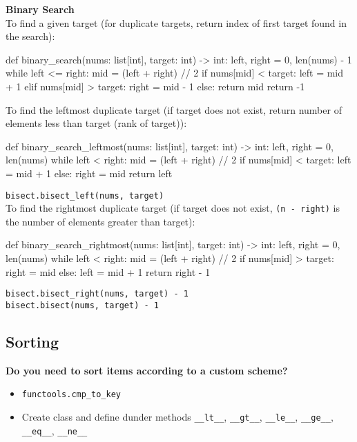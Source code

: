 \documentclass[12pt]{article}
\begin{document}
\begin{adjustwidth}{2em}{0pt}
\textbf{Binary Search}\medskip \\
To find a given target (for duplicate targets, return index of first target found in the search):
\begin{python}
def binary_search(nums: list[int], target: int) -> int:
    left, right = 0, len(nums) - 1
    while left <= right:
        mid = (left + right) // 2
        if nums[mid] < target:
            left = mid + 1
        elif nums[mid] > target:
            right = mid - 1
        else:
            return mid
    return -1
\end{python}
\bigskip

To find the leftmost duplicate target (if target does not exist, return number of elements less than target (rank of target)):
\begin{python}
def binary_search_leftmost(nums: list[int], target: int) -> int:
    left, right = 0, len(nums)
    while left < right:
        mid = (left + right) // 2
        if nums[mid] < target:
            left = mid + 1
        else:
            right = mid
    return left
\end{python}
\texttt{bisect.bisect\_left(nums, target)} \\

To find the rightmost duplicate target (if target does not exist, \texttt{(n - right)} is the number of elements greater than target):
\begin{python}
def binary_search_rightmost(nums: list[int], target: int) -> int:
    left, right = 0, len(nums)
    while left < right:
        mid = (left + right) // 2
        if nums[mid] > target:
            right = mid
        else:
            left = mid + 1
    return right - 1
\end{python}
\texttt{bisect.bisect\_right(nums, target) - 1} \\
\texttt{bisect.bisect(nums, target) - 1}
\end{adjustwidth}

\subsection*{Sorting}

\begin{adjustwidth}{2em}{0pt}
\textbf{Do you need to sort items according to a custom scheme?}
\begin{itemize}
  \item \texttt{functools.cmp\_to\_key} 
  \item Create class and define dunder methods \texttt{\_\_lt\_\_}, \texttt{\_\_gt\_\_}, \texttt{\_\_le\_\_}, \texttt{\_\_ge\_\_}, \texttt{\_\_eq\_\_}, \texttt{\_\_ne\_\_}
\end{itemize}
\end{adjustwidth}
\bigskip
\end{document}
